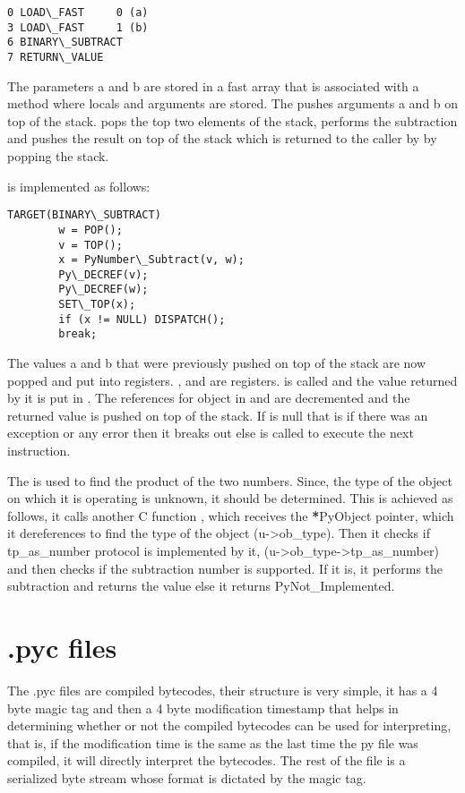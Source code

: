 \documentclass[letterpaper,10pt,dutch]{sphinxmanual}
\begin{document}
\begin{Verbatim}[commandchars=\\\{\}]
0 LOAD\_FAST     0 (a)
3 LOAD\_FAST     1 (b)
6 BINARY\_SUBTRACT
7 RETURN\_VALUE
\end{Verbatim}

The parameters a and b are stored in a fast array that is associated with a method where locals and arguments are stored. The  pushes arguments a and b on top of the stack.  pops the top two elements of the stack, performs the subtraction and pushes the result on top of the stack which is returned to the caller by  by popping the stack.

 is implemented as follows:

\begin{Verbatim}[commandchars=\\\{\}]
TARGET(BINARY\_SUBTRACT)
        w = POP();
        v = TOP();
        x = PyNumber\_Subtract(v, w);
        Py\_DECREF(v);
        Py\_DECREF(w);
        SET\_TOP(x);
        if (x != NULL) DISPATCH();
        break;
\end{Verbatim}

The values a and b that were previously pushed on top of the stack are now popped and put into registers. ,  and  are registers.  is called and the value returned by it is put in  . The references for object in  and  are decremented and the returned value is pushed on top of the stack. If  is null that is if there was an exception or any error then it breaks out else  is called to execute the next instruction.

The  is used to find the product of the two numbers. Since, the type of the object on which it is operating is unknown, it should be determined. This is achieved as follows, it calls another C function , which receives the {\color{red}\bfseries{}*}PyObject pointer, which it dereferences to find the type of the object (u-\textgreater{}ob\_type). Then it checks if tp\_as\_number protocol is implemented by it, (u-\textgreater{}ob\_type-\textgreater{}tp\_as\_number) and then checks if the subtraction number is supported. If it is, it performs the subtraction and returns the value else it returns PyNot\_Implemented.


\chapter{.pyc files}
\label{index:pyc-files}
The .pyc files are compiled bytecodes, their structure is very simple, it has a 4 byte magic tag and then a 4 byte modification timestamp that helps in determining whether or not the compiled bytecodes can be used for interpreting, that is, if the modification time is the same as the last time the py file was compiled, it will directly interpret the bytecodes. The rest of the file is a serialized byte stream whose format is dictated by the magic tag.
\end{document}
